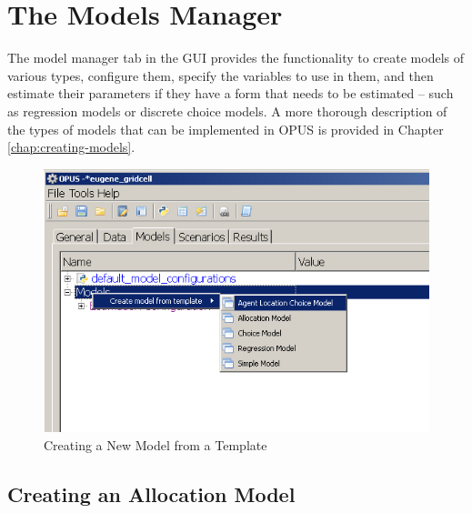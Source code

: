 \chapter{The Models Manager}

The model manager tab
 in the GUI provides the functionality to create models of various types, configure them, 
 specify the variables to use in them, and then estimate their parameters if they have a form that 
 needs to be estimated -- such as regression models or discrete choice models.  A more thorough 
 description of the types of models that can be implemented in OPUS is provided in Chapter \ref{chap:creating-models}.

\begin{figure}[htp]
\begin{center}
\includegraphics[scale=0.6]{part-gui/images/model-manager-create-model-from-template.png}
\end{center}
\caption{Creating a New Model from a Template}
\label{fig:create-model}
\end{figure}

\section{Creating an Allocation Model}

